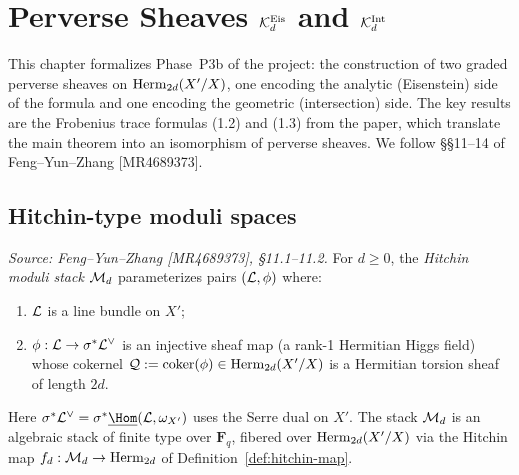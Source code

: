 \chapter{Perverse Sheaves \texorpdfstring{$\mathcal{K}_d^{\mathrm{Eis}}$}{K-Eis} and \texorpdfstring{$\mathcal{K}_d^{\mathrm{Int}}$}{K-Int}}
\label{chap:perverse-sheaves-K}

This chapter formalizes Phase~P3b of the project: the construction of two graded perverse
sheaves on \(\operatorname{Herm}_{2d}(X'/X)\), one encoding the analytic (Eisenstein) side of the formula
and one encoding the geometric (intersection) side. The key results are the Frobenius trace
formulas (1.2) and (1.3) from the paper, which translate the main theorem into an isomorphism
of perverse sheaves. We follow \S\S11--14 of Feng--Yun--Zhang [MR4689373].

\section{Hitchin-type moduli spaces}

\begin{definition}
  \label{def:hitchin-stack}
  \textit{Source: Feng--Yun--Zhang [MR4689373], \S11.1--11.2.}
  For \(d \geq 0\), the \emph{Hitchin moduli stack} \(\mathcal{M}_d\) parameterizes pairs
  \((\mathcal{L}, \phi)\) where:
  \begin{enumerate}
    \item \(\mathcal{L}\) is a line bundle on \(X'\);
    \item \(\phi : \mathcal{L} \to \sigma^*\mathcal{L}^\vee\) is an injective sheaf map (a rank-1
      Hermitian Higgs field) whose cokernel
      \(\mathcal{Q} := \operatorname{coker}(\phi) \in \operatorname{Herm}_{2d}(X'/X)\)
      is a Hermitian torsion sheaf of length \(2d\).
  \end{enumerate}
  Here \(\sigma^*\cL^\vee = \sigma^*\underline{\Hom}(\cL, \om_{X'})\) uses the Serre
  dual on \(X'\). The stack \(\mathcal{M}_d\) is an algebraic stack of finite type over
  \(\mathbf{F}_q\), fibered over \(\operatorname{Herm}_{2d}(X'/X)\) via the Hitchin map
  \(f_d : \mathcal{M}_d \to \operatorname{Herm}_{2d}\) of Definition~\ref{def:hitchin-map}.
\end{definition}

